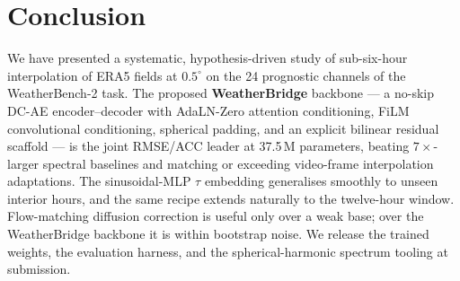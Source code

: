 \documentclass[10pt,letterpaper,twocolumn]{article}
\begin{document}
\section{Conclusion}

We have presented a systematic, hypothesis-driven study of sub-six-hour
interpolation of ERA5 fields at $0.5^\circ$ on the 24 prognostic
channels of the WeatherBench-2 task. The proposed \textbf{WeatherBridge}
backbone --- a no-skip DC-AE encoder--decoder with AdaLN-Zero
attention conditioning, FiLM convolutional conditioning, spherical
padding, and an explicit bilinear residual scaffold --- is the joint
RMSE/ACC leader at 37.5\,M parameters, beating $7{\times}$-larger
spectral baselines and matching or exceeding video-frame interpolation
adaptations. The sinusoidal-MLP $\tau$ embedding generalises smoothly
to unseen interior hours, and the same recipe extends naturally to the
twelve-hour window. Flow-matching diffusion correction is useful only
over a weak base; over the WeatherBridge backbone it is within
bootstrap noise. We release the trained weights, the evaluation
harness, and the spherical-harmonic spectrum tooling at submission.




\appendix

















\end{document}

